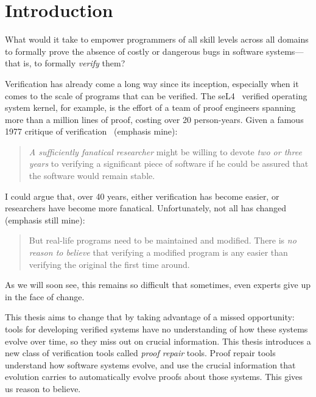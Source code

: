 \chapter{Introduction}



What would it take to empower programmers of all skill levels across all domains to formally prove
the absence of costly or dangerous bugs in software systems---that is, to formally \textit{verify} them?

Verification has already come a long way since its inception,
especially when it comes to the scale of programs that can be verified.
The seL4~\cite{Klein2009} verified operating system kernel, for example,
is the effort of a team of proof engineers spanning more than
a million lines of proof, costing over 20 person-years.
Given a famous 1977 critique of verification~\cite{DeMillo1977} (emphasis mine):

\begin{quote}
\textit{A sufficiently fanatical researcher}
might be willing to devote \textit{two or 
three years} to verifying a significant 
piece of software if he could be 
assured that the software would remain stable.
\end{quote}
I could argue that, over 40 years, either verification has become easier,
or researchers have become more fanatical. Unfortunately, not all has changed (emphasis still mine):

\begin{quote}
But real-life programs need to 
be maintained and modified. 
There is \textit{no reason to believe} that verifying a modified program is any 
easier than verifying the original the 
first time around.
\end{quote}
As we will soon see, this remains so difficult that sometimes, even experts give up in the face of change. %

This thesis aims to change that by taking advantage of a missed opportunity: tools for developing verified systems
have no understanding of how these systems evolve over time, so they miss out on crucial information.
This thesis introduces a new class of verification tools called \textit{proof repair} tools.
Proof repair tools understand how software systems evolve, and use the crucial information that evolution carries
to automatically evolve proofs about those systems.
This gives us reason to believe.

